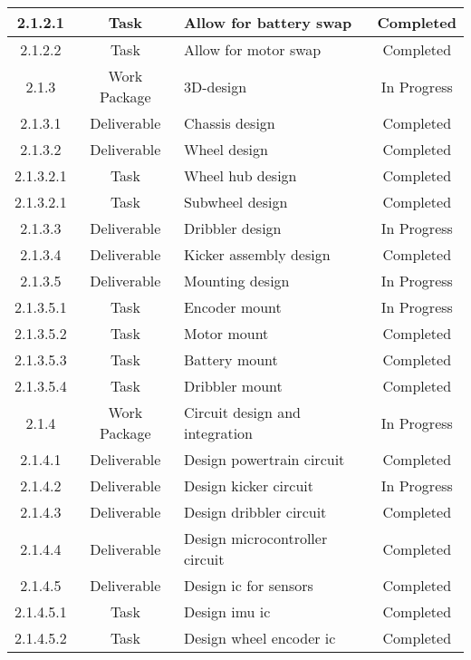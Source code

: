 \begin{longtable}{|c|c|m{}|c|}
    \rowcolor{d} 2.1.2.1 & Task & Allow for battery swap & Completed \\ \hline
    \rowcolor{d} 2.1.2.2 & Task & Allow for motor swap & Completed \\ \hline
    \rowcolor{p} 2.1.3 & Work Package & 3D-design & In Progress \\ \hline
    \rowcolor{d} 2.1.3.1 & Deliverable & Chassis design & Completed \\ \hline
    \rowcolor{d} 2.1.3.2 & Deliverable & Wheel design & Completed \\ \hline
    \rowcolor{d} 2.1.3.2.1 & Task & Wheel hub design & Completed \\ \hline
    \rowcolor{d} 2.1.3.2.1 & Task & Subwheel design & Completed \\ \hline
    \rowcolor{p} 2.1.3.3 & Deliverable & Dribbler design & In Progress \\ \hline
    \rowcolor{d} 2.1.3.4 & Deliverable & Kicker assembly design & Completed \\ \hline
    \rowcolor{p} 2.1.3.5 & Deliverable & Mounting design & In Progress \\ \hline
    \rowcolor{p} 2.1.3.5.1 & Task & Encoder mount & In Progress \\ \hline
    \rowcolor{d} 2.1.3.5.2 & Task & Motor mount & Completed \\ \hline
    \rowcolor{d} 2.1.3.5.3 & Task & Battery mount & Completed \\ \hline
    \rowcolor{d} 2.1.3.5.4 & Task & Dribbler mount & Completed \\ \hline
    \rowcolor{p} 2.1.4 & Work Package & Circuit design and integration & In Progress \\ \hline
    \rowcolor{d} 2.1.4.1 & Deliverable & Design powertrain circuit & Completed \\ \hline
    \rowcolor{p} 2.1.4.2 & Deliverable & Design kicker circuit & In Progress \\ \hline
    \rowcolor{d} 2.1.4.3 & Deliverable & Design dribbler circuit & Completed \\ \hline
    \rowcolor{d} 2.1.4.4 & Deliverable & Design microcontroller circuit & Completed \\ \hline
    \rowcolor{d} 2.1.4.5 & Deliverable & Design \acs{ic} for sensors & Completed \\ \hline
    \rowcolor{d} 2.1.4.5.1 & Task & Design \acs{imu} \acs{ic} & Completed \\ \hline
    \rowcolor{d} 2.1.4.5.2 & Task & Design wheel encoder \acs{ic} & Completed \\ \hline

\end{longtable}
